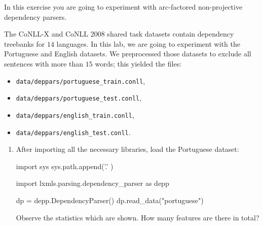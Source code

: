 \begin{exercise}
In this exercise you are going to experiment with arc-factored non-projective dependency parsers. 

The CoNLL-X and CoNLL 2008 shared task datasets \citep{conll06st,Surdeanu2008} contain 
dependency treebanks for $14$ languages. 
In this lab, we are going to experiment with the Portuguese and English datasets. 
We preprocessed those datasets to exclude all sentences with more than 
$15$ words; this yielded the files:
\begin{itemize}
\item {\tt data/deppars/portuguese\_train.conll},
\item {\tt data/deppars/portuguese\_test.conll},
\item {\tt data/deppars/english\_train.conll},
\item {\tt data/deppars/english\_test.conll}.
\end{itemize}

\begin{enumerate}
\item After importing all the necessary libraries, load the Portuguese dataset: 
\begin{python}
import sys
sys.path.append('.' )

import lxmls.parsing.dependency_parser as depp

dp = depp.DependencyParser()
dp.read_data("portuguese")
\end{python}
Observe the statistics which are shown. How many features are there in total?


\end{enumerate}
\end{exercise}
